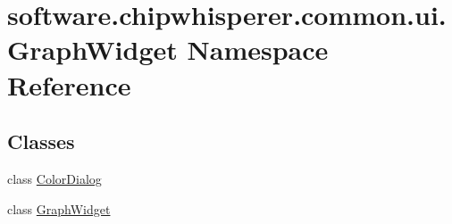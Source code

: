 \hypertarget{namespacesoftware_1_1chipwhisperer_1_1common_1_1ui_1_1GraphWidget}{}\section{software.\+chipwhisperer.\+common.\+ui.\+Graph\+Widget Namespace Reference}
\label{namespacesoftware_1_1chipwhisperer_1_1common_1_1ui_1_1GraphWidget}
\subsection*{Classes}
\begin{DoxyCompactItemize}
\item 
class \hyperlink{classsoftware_1_1chipwhisperer_1_1common_1_1ui_1_1GraphWidget_1_1ColorDialog}{Color\+Dialog}
\item 
class \hyperlink{classsoftware_1_1chipwhisperer_1_1common_1_1ui_1_1GraphWidget_1_1GraphWidget}{Graph\+Widget}
\end{DoxyCompactItemize}
